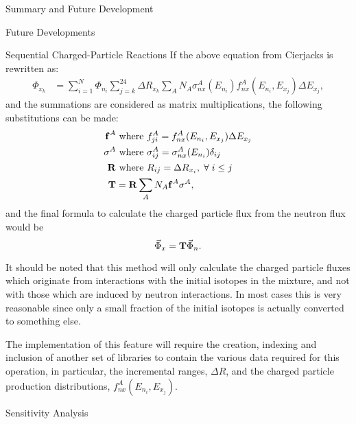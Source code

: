 \begin{chapter}{Summary and Future Development}
\begin{section}{Future Developments}
\begin{subsection}{Sequential Charged-Particle Reactions}
      If the above equation from Cierjacks\cite{sequential} is
      rewritten as:
      \begin{equation}
        \begin{split}
          \Phi_{x_k} &= \sum_{i=1}^N \Phi_{n_i} \sum_{j=k}^{24} \Delta R_{x_k}
          \sum_A N_A \sigma_{nx}^A(E_{n_i}) f_{nx}^A(E_{n_i},E_{x_j}) \Delta E_{x_j},
        \end{split}
      \end{equation}
      and the summations are considered as matrix multiplications, the
      following substitutions can be made:
      \begin{equation}
        \begin{split}
          \mbox{$\mathbf{f}$}^A &\text{ where } f_{ji}^A = f_{nx}^A(E_{n_i},E_{x_j})\Delta E_{x_j}\\
          \mbox{$\mathbf{\sigma}$}^A &\text{ where } \sigma_{ij}^A = \sigma_{nx}^A(E_{n_i}) \delta_{ij}\\
          \mbox{$\mathbf{R}$} &\text{ where } R_{ij} = \Delta R_{x_i},\; \forall\; i \leq j\\
          \mbox{$\mathbf{T}$} &= \mbox{$\mathbf{R}$} \sum_A N_A \mbox{$\mathbf{f}$}^A \mbox{$\mathbf{\sigma}$}^A,
        \end{split}
      \end{equation}
      and the final formula to calculate the charged particle flux from
      the neutron flux would be
      \begin{equation}
        \vec{\Phi}_x = \mbox{$\mathbf{T}$}\vec{\Phi}_n.
      \end{equation}
      
      It should be noted that this method will only calculate the
      charged particle fluxes which originate from interactions with
      the initial isotopes in the mixture, and not with those which
      are induced by neutron interactions.  In most cases this is very
      reasonable since only a small fraction of the initial isotopes
      is actually converted to something else.
    
      The implementation of this feature will require the creation,
      indexing and inclusion of another set of libraries to contain
      the various data required for this operation, in particular, the
      incremental ranges, $\Delta R$, and the charged particle
      production distributions, $f_{nx}^A(E_{n_i},E_{x_j})$.
    \end{subsection}

    \begin{subsection}{Sensitivity Analysis}\label{ssec:future.data.sens}
    

\end{subsection}
\end{section}
\end{chapter}
